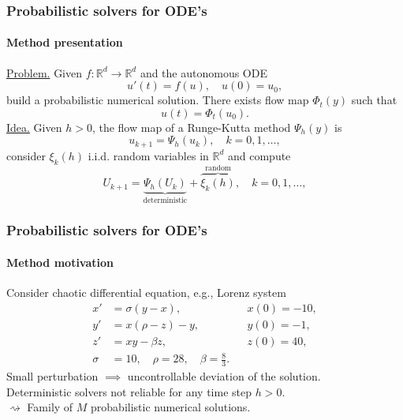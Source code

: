 \documentclass{beamer}
\newcommand{\R}{\mathbb{R}}
\begin{document}
\begin{frame}
	\frametitle{Probabilistic solvers for ODE's}
	\framesubtitle{Method presentation \cite{CGS16}}
	
	\underline{Problem.} Given $f\colon\R^d\to\R^d$ and the autonomous ODE 
	\begin{equation*}
		u'(t) = f(u), \quad	u(0) = u_0, 
	\end{equation*}
	build a probabilistic numerical solution. There exists flow map $\Phi_t(y)$ such that
	\begin{equation*}
		u(t) = \Phi_t(u_0).
	\end{equation*}
	\underline{Idea.} Given $h > 0$, the flow map of a Runge-Kutta method $\Psi_h(y)$ is
	\begin{equation*}
		u_{k+1} = \Psi_h(u_k), \quad k = 0, 1, \ldots,
	\end{equation*}
	consider $\xi_k(h)$ i.i.d. random variables in $\R^d$ and compute
	\begin{equation*}
		U_{k+1} = \underbrace{\Psi_h(U_k)}_{\text{deterministic}} + \overbrace{\xi_k(h)}^{\text{random}}, \quad k = 0, 1, \ldots,
	\end{equation*}
	
\end{frame}

\begin{frame}
	\frametitle{Probabilistic solvers for ODE's}
	\framesubtitle{Method motivation}
	
	Consider chaotic differential equation, e.g., Lorenz system
	\begin{equation*}\label{eq:Lorenz}
	\begin{aligned}
		x' &= \sigma(y - x), \quad &&x(0) = -10,\\
		y' &= x(\rho - z) - y, \quad &&y(0) = -1,\\
		z' &= xy - \beta z, \quad &&z(0) = 40,\\
		\sigma &= 10, \quad \rho = 28, \quad \beta = \frac{8}{3}.
	\end{aligned}
	\end{equation*}
	Small perturbation $\implies$ uncontrollable deviation of the solution. \\
	Deterministic solvers not reliable for any time step $h > 0$. \\
	$\rightsquigarrow$ Family of $M$ probabilistic numerical solutions.
\end{frame}
\end{document}
